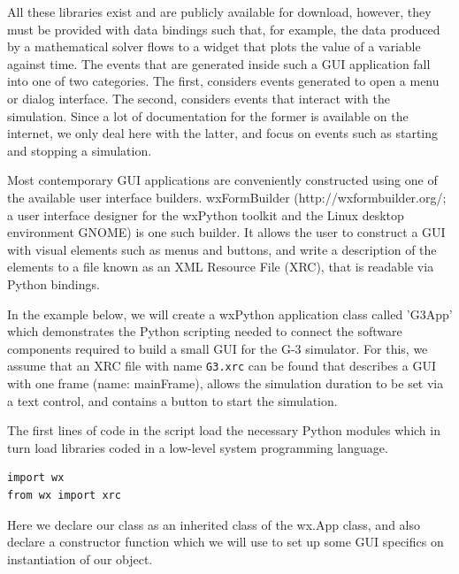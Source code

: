 \documentclass[12pt]{article}
\begin{document}
All these libraries exist and are publicly available for download,
however, they must be provided with data bindings such that, for
example, the data produced by a mathematical solver flows to a widget
that plots the value of a variable against time.  The events that are
generated inside such a GUI application fall into one of two
categories.  The first, considers events generated to open a menu or
dialog interface.  The second, considers events that interact with the
simulation.  Since a lot of documentation for the former is available
on the internet, we only deal here with the latter, and focus on
events such as starting and stopping a simulation.

Most contemporary GUI applications are conveniently constructed using
one of the available user interface builders.  wxFormBuilder
(http://wxformbuilder.org/; a user interface designer for the wxPython
toolkit and the Linux desktop environment GNOME) is one such builder.
It allows the user to construct a GUI with visual elements such as
menus and buttons, and write a description of the elements to a file 
known as an XML Resource File (XRC), that is readable via Python bindings.



In the example below, we will create a wxPython application class 
called 'G3App' which demonstrates the Python scripting needed to 
connect the software components required to build a small GUI for 
the G-3 simulator.  For this, we assume that an XRC file with name
{\tt G3.xrc} can be found that describes a GUI with one frame (name:
mainFrame), allows the simulation duration to be set via a
text control, and contains a button to start the simulation.

The first lines of code in the script load the necessary Python
modules which in turn load libraries coded in a low-level system
programming language.

{\footnotesize
  \resetlinenumber
  \linenumbers
\begin{verbatim}
import wx
from wx import xrc
\end{verbatim}
}

Here we declare our class as an inherited class of the wx.App class, 
and also declare a constructor function which we will use to set up 
some GUI specifics on instantiation of our object.
\end{document}
